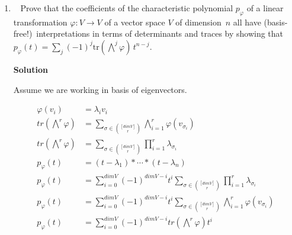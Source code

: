 \documentclass[11pt]{article}
\newcommand\score[1]{\marginpar{\vspace{-2ex}\color{blue}{#1/14}}\hspace{-1ex}}
\newcommand\0{\mathbf{0}}
\newcommand\<{\langle}
\renewcommand\>{\rangle}
\begin{document}
\begin{enumerate}
For the first line to become equality we need that all the eigenvalues of $A$ have to be the same, let this value be $\omega ||A||$(The eigenvalue's magnitude will be the operator norm if all the eigenvalues are the same) . For the hadamard inequality to become equality on the third line we need that 
$||(A-\tilde \lambda)x_{i}||_{2}$ are an orthogonal set(That is when the Hadamard inequality becomes equality). Continuing on the transition from the $4^{th}$ to last line we need to have that,
$||(A-\tilde \lambda)x_{i}||_{2}=(||A||_{2}+||\tilde A||_{2})$, but for the triangle inequality to become equality, we need that the vectors be parallel.
So the $x_{i}$'s are an eigenvector of $A$. I couldn't prove that $A$ is diagonal(it would be diagonal if all vectors where in its eigenspace but I can't guarantee such a strong condition, since it depends $\tilde A$), but I can still say that say that $\tilde \lambda$ would have to be 
$-\omega ||\tilde A||$, since it has to be in the opposite direciton of $\omega ||A||$. Ofcourse $|\omega|$ has to be 1, since the eigenvalues of $|A|$ are all the same.
And from this we also know that $||E||=||A||+||\tilde A||$. Completing the proof. On a sidenote, $A$ would have to be diagonal, if it was written the basis of the eigenvectors of $\tilde A$, then it would satisfy the property, but I can't guarantee that either.

\item\ \score{}%
Prove that the coefficients of the characteristic polynomial
$p_\varphi$ of a linear transformation $\varphi: V \to V$ of a vector
space $V$ of dimension~$n$ all have (basis-free!)\ interpretations in
terms of determinants and traces by showing that $p_\varphi(t) =
\sum_j (-1)^j \mathrm{tr}(\bigwedge^j \varphi)\,t^{n-j}$.

\textbf{Solution}

Assume we are working in basis of eigenvectors. 

\begin{align}
	\varphi(v_{i})&=\lambda_{i}v_{i}\\
	tr\left( \bigwedge^r \varphi\right)&= \sum_{\sigma \in \binom{[dim V]}{r}}\bigwedge_{i=1}^{r}\varphi(v_{\sigma_{i}})\\
	tr\left( \bigwedge^r \varphi\right)&= \sum_{\sigma \in \binom{[dim V]}{r}}\prod_{i=1}^{r}\lambda_{\sigma_{i}}\\
	p_{\varphi}(t)&=(t-\lambda_{1})*\cdots *(t-\lambda_{n})\\
	p_{\varphi}(t)&=\sum_{i=0}^{dim V}(-1)^{dimV-i}t^{i}\sum_{\sigma \in \binom{[dim V]}{r}}\prod_{i=1}^{r}\lambda_{\sigma_{i}}\\
	p_{\varphi}(t)&=\sum_{i=0}^{dim V}(-1)^{dimV-i}t^{i}\sum_{\sigma \in \binom{[dim V]}{r}}\bigwedge_{i=1}^{r}\varphi(v_{\sigma_{i}})\\
	p_{\varphi}(t)&=\sum_{i=0}^{dim V}(-1)^{dimV-i}tr\left( \bigwedge^r \varphi\right)t^{i}\\
\end{align}


\end{enumerate}
\end{document}
